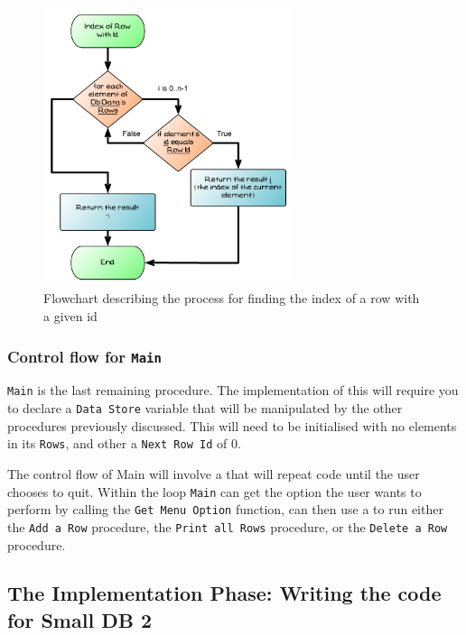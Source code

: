 \begin{figure}[h]
   \centering
   \includegraphics[width=0.65\textwidth]{./topics/dynamic-memory/diagrams/IndexOfRowFlow} 
   \caption{Flowchart describing the process for finding the index of a row with a given id}
   \label{fig:index-of-row-flow}
\end{figure}



\subsubsection{Control flow for \texttt{Main}} %
\label{ssub:control_flow_for_main}

\texttt{Main} is the last remaining procedure. The implementation of this will require you to declare a \texttt{Data Store} variable that will be manipulated by the other procedures previously discussed. This will need to be initialised with no elements in its \texttt{Rows}, and other a \texttt{Next Row Id} of 0.

The control flow of Main will involve a  that will repeat code until the user chooses to quit. Within the loop \texttt{Main} can get the option the user wants to perform by calling the \texttt{Get Menu Option} function, can then use a  to run either the \texttt{Add a Row} procedure, the \texttt{Print all Rows} procedure, or the \texttt{Delete a Row} procedure.


\clearpage
\subsection{The Implementation Phase: Writing the code for Small DB 2} %
\label{sub:writing_the_code_for_small_db_2}

